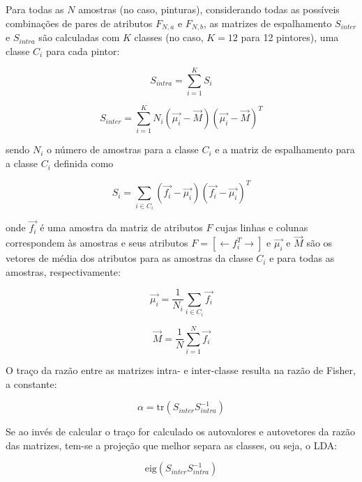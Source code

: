 Para todas as $N$ amostras (no caso, pinturas), considerando todas as possíveis
combinações de pares de atributos $F_{N, a}$ e $F_{N, b}$, as matrizes de
espalhamento $S_{inter}$ e $S_{intra}$ são calculadas com $K$ classes (no caso,
$K = 12$ para 12 pintores), uma classe $C_i$ para cada pintor:

\begin{equation}
S_{intra} = \sum_{i=1}^K S_i
\end{equation}

\begin{equation}
S_{inter} = \sum_{i=1}^K N_i(\vec{\mu_i} - \vec{M})(\vec{\mu_i} - \vec{M})^T
\end{equation}

\noindent sendo $N_i$ o número de amostras para a classe $C_i$ e a matriz de
espalhamento para a classe $C_i$ definida como

\begin{equation}
S_i = \sum_{i \in C_i} (\vec{f_i} - \vec{\mu_i})(\vec{f_i} - \vec{\mu_i})^T
\end{equation}

\noindent onde $\vec{f_i}$ é uma amostra da matriz de atributos $F$ cujas linhas
e colunas correspondem às amostras e seus atributos $F = \left[ \leftarrow
  f_i^T \rightarrow \right]$ e $\vec{\mu_i}$ e $\vec{M}$ são os vetores de média
dos atributos para as amostras da classe $C_i$ e para todas as amostras,
respectivamente:

\begin{equation} 
\vec{\mu_i} = \frac{1}{N_i} \sum_{i \in C_i} \vec{f_i}
\end{equation}

\begin{equation}
\vec{M} = \frac{1}{N} \sum_{i=1}^N \vec{f_i}
\end{equation}

O traço da razão entre as matrizes intra- e inter-classe resulta na razão de
Fisher, a constante:

\begin{equation} \label{eq:alpha}
\alpha = \mathrm{tr}(S_{inter} S_{intra}^{-1})
\end{equation}

Se ao invés de calcular o traço for calculado os autovalores e autovetores da
razão das matrizes, tem-se a projeção que melhor separa as classes, ou seja, o LDA:

\begin{equation} \label{eq:lda}
\text{eig}(S_{inter} S_{intra}^{-1})
\end{equation}

